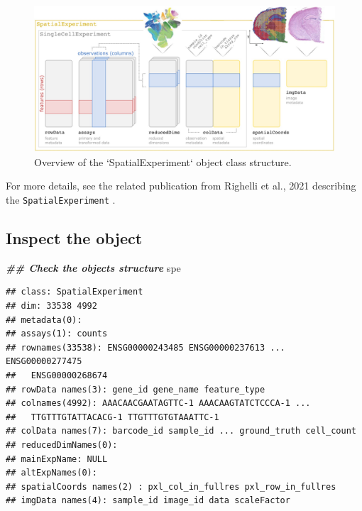 \documentclass[
]{book}
\newenvironment{Shaded}{\begin{snugshade}}{\end{snugshade}}
\newcommand{\DocumentationTok}[1]{\textcolor[rgb]{0.56,0.35,0.01}{\textbf{\textit{#1}}}}
\newcommand{\NormalTok}[1]{#1}
\begin{document}
\begin{figure}

{\centering \includegraphics[width=1\linewidth]{images/SpatialExperiment} 

}

\caption{Overview of the `SpatialExperiment` object class structure.}\label{fig:SpExp-overview}
\end{figure}

For more details, see the related publication from Righelli et al., 2021 describing the \texttt{SpatialExperiment} \citep{Righelli2022Jun}.

\hypertarget{inspect-the-object}{%
\subsection{Inspect the object}\label{inspect-the-object}}

\begin{Shaded}
\begin{Highlighting}[]
\DocumentationTok{\#\# Check the object\textquotesingle{}s structure}
\NormalTok{spe}
\end{Highlighting}
\end{Shaded}

\begin{verbatim}
## class: SpatialExperiment 
## dim: 33538 4992 
## metadata(0):
## assays(1): counts
## rownames(33538): ENSG00000243485 ENSG00000237613 ... ENSG00000277475
##   ENSG00000268674
## rowData names(3): gene_id gene_name feature_type
## colnames(4992): AAACAACGAATAGTTC-1 AAACAAGTATCTCCCA-1 ...
##   TTGTTTGTATTACACG-1 TTGTTTGTGTAAATTC-1
## colData names(7): barcode_id sample_id ... ground_truth cell_count
## reducedDimNames(0):
## mainExpName: NULL
## altExpNames(0):
## spatialCoords names(2) : pxl_col_in_fullres pxl_row_in_fullres
## imgData names(4): sample_id image_id data scaleFactor
\end{verbatim}
\end{document}
